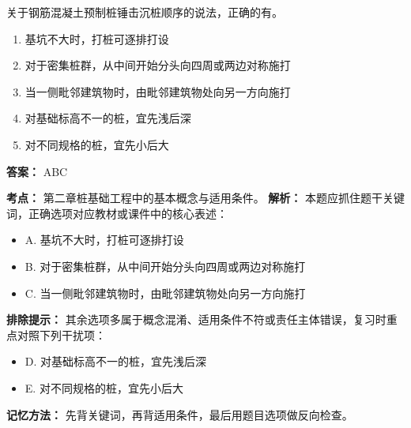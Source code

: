 \documentclass[UTF8,fontset=fandol,11pt]{ctexart}
\begin{document}
\vspace{0.2em}

\begin{quizbox}[title={第 10 题}]
关于钢筋混凝土预制桩锤击沉桩顺序的说法，正确的有。\\
\begin{enumerate}[label=\Alph*.]
\item 基坑不大时，打桩可逐排打设
\item 对于密集桩群，从中间开始分头向四周或两边对称施打
\item 当一侧毗邻建筑物时，由毗邻建筑物处向另一方向施打
\item 对基础标高不一的桩，宜先浅后深
\item 对不同规格的桩，宜先小后大
\end{enumerate}
\textbf{答案：} ABC
\vspace{0.25em}
\begin{answerbox}[title={考点解析}]
\textbf{考点：} 第二章桩基础工程中的基本概念与适用条件。
\textbf{解析：} 本题应抓住题干关键词，正确选项对应教材或课件中的核心表述：
\begin{itemize}
\item A. 基坑不大时，打桩可逐排打设
\item B. 对于密集桩群，从中间开始分头向四周或两边对称施打
\item C. 当一侧毗邻建筑物时，由毗邻建筑物处向另一方向施打
\end{itemize}
\textbf{排除提示：} 其余选项多属于概念混淆、适用条件不符或责任主体错误，复习时重点对照下列干扰项：
\begin{itemize}
\item D. 对基础标高不一的桩，宜先浅后深
\item E. 对不同规格的桩，宜先小后大
\end{itemize}
\textbf{记忆方法：} 先背关键词，再背适用条件，最后用题目选项做反向检查。
\end{answerbox}
\end{quizbox}

\vspace{0.2em}
\end{document}

